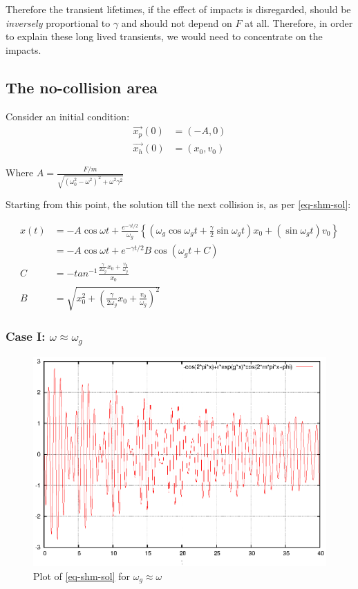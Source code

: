 \documentclass{book}
\renewcommand{\(}{\begin{columns}}
\renewcommand{\)}{\end{columns}}
\newcommand{\<}[1]{\begin{column}{#1}}
\renewcommand{\>}{\end{column}}
\begin{document}
Therefore the transient lifetimes, if the effect of impacts is disregarded, should be \emph{inversely} proportional to 
$\gamma$ and should not depend on $F$ at all.  Therefore, in order to explain 
these long lived transients, we would need to concentrate on the impacts.  

\subsection{The no-collision area}
Consider an initial condition:
\begin{align*}
\vec{x_p}(0)&=(-A,0)\\
\vec{x_h}(0)&=(x_0,v_0)
\end{align*}

Where $A=\frac{F/m}{\sqrt{(\omega_0^2-\omega^2)^2+\omega^2\gamma^2}}$

Starting from this point, the solution till the next collision is, as per \eqref{eq-shm-sol}:

\begin{align*}
x(t)&=-A\cos{\omega t}+\frac{e^{-\gamma t/2}}{\omega_g}\left\{(\omega_g\cos{\omega_gt}+\frac{\gamma}{2}\sin{\omega_gt})x_0 + (\sin{\omega_gt})v_0 \right\}\\
&=-A\cos{\omega t}+e^{-\gamma t/2}B\cos{\left(\omega_g t+C\right)}\\
C&=-tan^{-1}\frac{\frac{\gamma}{2\omega_g}x_0+\frac{v_0}{\omega_g}}{x_0}\\
B&=\sqrt{x_0^2+\left(\frac{\gamma}{2\omega_g}x_0+\frac{v_0}{\omega_g}\right)^2}
\end{align*}

\subsubsection{Case I: $\omega\approx\omega_g$}
\begin{figure}[!htb]
\begin{center}
\caption{Plot of \eqref{eq-shm-sol} for $\omega_g\approx\omega$}
\label{fig-shm-plot}
\includegraphics[width=0.6\columnwidth]{beats-decaying}
\end{center}
\end{figure}
\end{document}
